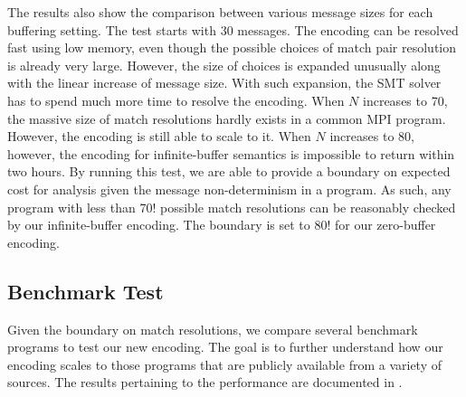 The results also show the comparison between various message sizes for each buffering setting. The test starts with $30$ messages. The encoding can be resolved fast using low memory, even though the possible choices of match pair resolution is already very large. However, the size of choices is expanded unusually along with the linear increase of message size. With such expansion, the SMT solver has to spend much more time to resolve the encoding. When $\mathit{N}$ increases to 70, the massive size of match resolutions hardly exists in a common MPI program. However, the encoding is still able to scale to it. When $\mathit{N}$ increases to 80, however, the encoding for infinite-buffer semantics is impossible to return within two hours. By running this test, we are able to provide a boundary on expected cost for analysis given the message non-determinism in a program. As such, any program with less than 70! possible match resolutions can be reasonably checked by our infinite-buffer encoding. The boundary is set to 80! for our zero-buffer encoding.

\subsection{Benchmark Test}
Given the boundary on match resolutions, we compare several benchmark programs to test our new encoding. The goal is to further understand how our encoding scales to those programs that are publicly available from a variety of sources. The results pertaining to the performance are documented in . 

